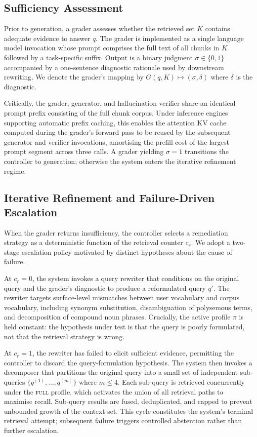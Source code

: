 \subsection{Sufficiency Assessment}
\label{sec:grader}

Prior to generation, a grader assesses whether the retrieved set $K$
contains adequate evidence to answer $q$. The grader is implemented as
a single language model invocation whose prompt comprises the full text
of all chunks in $K$ followed by a task-specific suffix. Output is a
binary judgment $\sigma \in \{0, 1\}$ accompanied by a one-sentence
diagnostic rationale used by downstream rewriting. We denote the
grader's mapping by $G(q, K) \mapsto (\sigma, \delta)$ where $\delta$ is
the diagnostic.

Critically, the grader, generator, and hallucination verifier share an
identical prompt prefix consisting of the full chunk corpus. Under
inference engines supporting automatic prefix caching, this enables the
attention KV cache computed during the grader's forward pass to be
reused by the subsequent generator and verifier invocations,
amortising the prefill cost of the largest prompt segment across three
calls. A grader yielding $\sigma = 1$ transitions the controller to
generation; otherwise the system enters the iterative refinement
regime.

\subsection{Iterative Refinement and Failure-Driven Escalation}
\label{sec:escalation}

When the grader returns insufficiency, the controller selects a
remediation strategy as a deterministic function of the retrieval
counter $c_r$. We adopt a two-stage escalation policy motivated by
distinct hypotheses about the cause of failure.

At $c_r = 0$, the system invokes a query rewriter that conditions on
the original query and the grader's diagnostic to produce a reformulated
query $q'$. The rewriter targets surface-level mismatches between
user vocabulary and corpus vocabulary, including synonym substitution,
disambiguation of polysemous terms, and decomposition of compound noun
phrases. Crucially, the active profile $\pi$ is held constant: the
hypothesis under test is that the query is poorly formulated, not that
the retrieval strategy is wrong.

At $c_r = 1$, the rewriter has failed to elicit sufficient evidence,
permitting the controller to discard the query-formulation hypothesis.
The system then invokes a decomposer that partitions the original
query into a small set of independent sub-queries
$\{q^{(1)}, \ldots, q^{(m)}\}$ where $m \le 4$. Each sub-query is
retrieved concurrently under the \textsc{full} profile, which activates
the union of all retrieval paths to maximise recall. Sub-query results
are fused, deduplicated, and capped to prevent unbounded growth of the
context set. This cycle constitutes the system's terminal retrieval
attempt; subsequent failure triggers controlled abstention rather than
further escalation.


